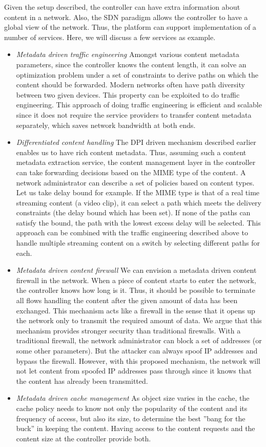\documentclass[conference]{IEEEtran}
\begin{document}
Given the setup described, the controller can have extra information about content in a network. Also, the SDN paradigm allows the controller to have a global view of the network. Thus, the platform can support implementation of a number of services. Here, we will discuss a few services as example.
\begin{itemize}
\item \emph{Metadata driven traffic engineering}
Amongst various content metadata parameters, since the controller knows the content length, it can solve an optimization problem under a set of constraints to derive paths on which the content should be forwarded. Modern networks often have path diversity between two given devices. This property can be exploited to do traffic engineering. This approach of doing traffic engineering is efficient and scalable since it does not require the service providers to transfer content metadata separately, which saves network bandwidth at both ends.

\item \emph{Differentiated content handling}
The DPI driven mechanism
described earlier enables us to have rich content
metadata. Thus, assuming such a content metadata extraction
service, the content management layer in the
controller can take forwarding decisions based on the
MIME type of the content. A network administrator can
describe a set of policies based on content types. Let us
take delay bound for example. If the MIME type is that of
a real time streaming content (a video clip), it can select
a path which meets the delivery constraints (the delay
bound which has been set). If none of the paths can satisfy
the bound, the path with the lowest excess delay will be
selected. This approach can be combined with the traffic
engineering described above to handle multiple streaming
content on a switch by selecting different paths for each.

\item \emph{Metadata driven content firewall}
We can envision a
metadata driven content firewall in the network. When a
piece of content starts to enter the network, the controller
knows how long is it. Thus, it should be possible to
terminate all flows handling the content after the given
amount of data has been exchanged. This mechanism
acts like a firewall in the sense that it opens up the
network only to transmit the required amount of data.
We argue that this mechanism provides stronger security
than traditional firewalls. With a traditional firewall, the
network administrator can block a set of addresses (or
some other parameters). But the attacker can always spoof IP addresses and bypass the firewall. However, with this
proposed mechanism, the network will not let content
from spoofed IP addresses pass through since it knows
that the content has already been transmitted.
\item \emph{Metadata driven cache management}
As object size varies
in the cache, the cache policy needs to know not only the
popularity of the content and its frequency of access, but
also its size, to determine the best ”bang for the buck” in
keeping the content. Having access to the content requests
and the content size at the controller provide both.
\end{itemize}
\end{document}
